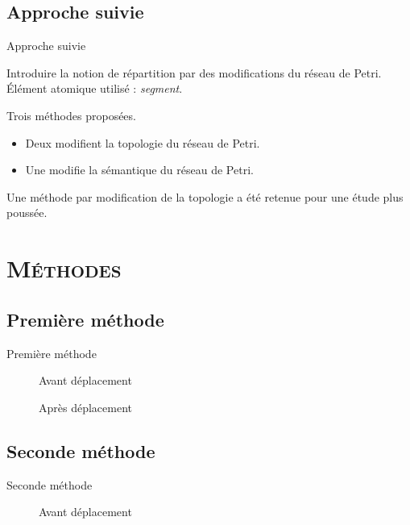\subsection{Approche suivie}
\begin{frame}{Approche suivie}
	\begin{itemize}
		\itemar Introduire la notion de répartition par des modifications du réseau de Petri.
		\itemar Élément atomique utilisé : \textit{segment}.
	\end{itemize}
	\vspace{1em}
	Trois méthodes proposées.
	\begin{itemize}
		\item Deux modifient la topologie du réseau de Petri.
		\item Une modifie la sémantique du réseau de Petri.
	\end{itemize}
	
	Une méthode par modification de la topologie a été retenue pour une étude plus poussée.
\end{frame}

\section{\scshape Méthodes}
\subsection{Première méthode}
\begin{frame}{Première méthode}
	\begin{figure}[h!]
		\centering
		\resizebox{!}{2cm}{}
		\caption{Avant déplacement}
		\label{fig:deplacementMethode1}
	\end{figure}
	\begin{figure}[h!]
		\centering
		\resizebox{!}{3cm}{}
		\caption{Après déplacement}
		\label{fig:deplacementMethode1-2}
	\end{figure}
\end{frame}

\subsection{Seconde méthode}
\begin{frame}{Seconde méthode}
	\begin{figure}[h!]
		\centering
		
		\caption{Avant déplacement}
		\label{fig:deplacementMethode2}
	\end{figure}
\end{frame}

